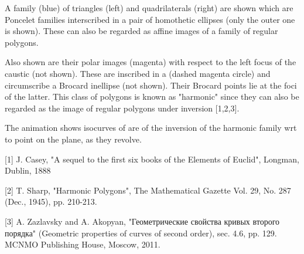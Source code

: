 A family (blue) of triangles (left) and quadrilaterals (right) are shown which are Poncelet families interscribed in a pair of homothetic ellipses (only the outer one is shown). These can also be regarded as affine images of a family of regular polygons.

Also shown are their polar images (magenta) with respect to the left focus of the caustic (not shown). These are  inscribed in a (dashed magenta circle) and circumscribe a Brocard inellipse (not shown). Their Brocard points lie at the foci of the latter. This class of polygons is known as "harmonic" since they can also be regarded as the image of regular polygons under inversion [1,2,3].

The animation shows isocurves of are of the inversion of the harmonic family wrt to point on the plane, as they revolve.

[1] J. Casey, "A sequel to the first six books of the Elements of Euclid", Longman, Dublin, 1888

[2] T. Sharp, "Harmonic Polygons", The Mathematical Gazette
Vol. 29, No. 287 (Dec., 1945), pp. 210-213.

[3] A. Zazlavsky and A. Akopyan, "Геометрические свойства кривых
второго порядка" (Geometric properties of curves of second order), sec. 4.6, pp. 129. MCNMO Publishing House, Moscow, 2011.